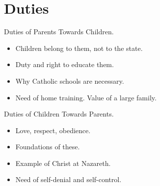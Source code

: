 \documentclass{beamer}
\begin{document}
\section{Duties}

\begin{frame}{Duties of Parents Towards Children.}
\begin{itemize}
 \item   Children belong to them, not to the state.
 \item   Duty and right to educate them.
 \item   Why Catholic schools are necessary.
 \item   Need of home training. Value of a large family.
\end{itemize}
\end{frame}

\begin{frame}{Duties of Children Towards Parents.}
\begin{itemize}
 \item   Love, respect, obedience.
 \item   Foundations of these.
 \item   Example of Christ at Nazareth.
 \item   Need of self-denial and self-control.
\end{itemize}
\end{frame}
\end{document}
